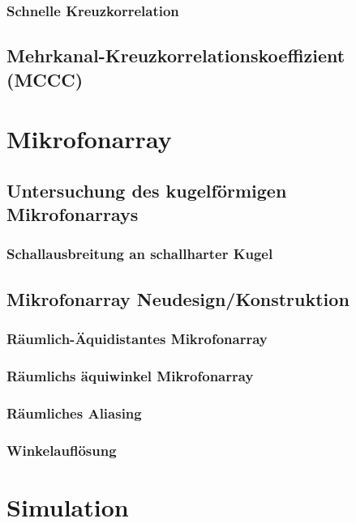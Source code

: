 			\subsubsection{Schnelle Kreuzkorrelation}
		\subsection{Mehrkanal-Kreuzkorrelationskoeffizient (MCCC)}

	\section{Mikrofonarray}
		\subsection{Untersuchung des kugelförmigen Mikrofonarrays}
			\subsubsection{Schallausbreitung an schallharter Kugel}
			
		\subsection{Mikrofonarray Neudesign/Konstruktion}
			\subsubsection{Räumlich-Äquidistantes Mikrofonarray}
			\subsubsection{Räumlichs äquiwinkel Mikrofonarray}
			\subsubsection{Räumliches Aliasing}
			\subsubsection{Winkelauflösung}
			

		
	\section{Simulation}

